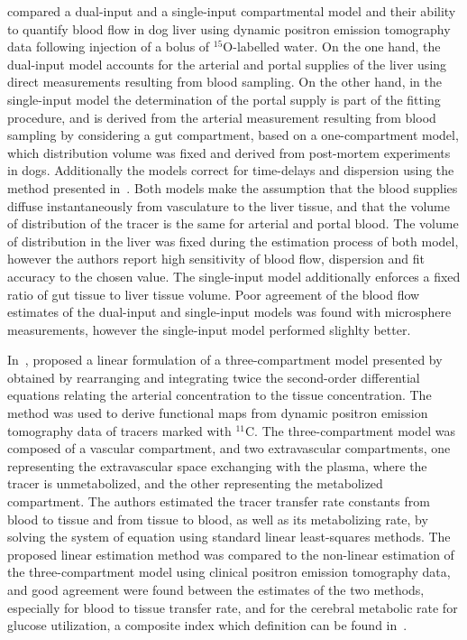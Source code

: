 \citet{Ziegler:1996cs} compared a dual-input and a single-input compartmental model and their ability to quantify blood flow in dog liver using dynamic positron emission tomography data following injection of a bolus of $^{15}$O-labelled water.
On the one hand, the dual-input model accounts for the arterial and portal supplies of the liver using direct measurements resulting from blood sampling.
On the other hand, in the single-input model the determination of the portal supply is part of the fitting procedure, and is derived from the arterial measurement resulting from blood sampling by considering a gut compartment, based on a one-compartment model, which distribution volume was fixed and derived from post-mortem experiments in dogs.
Additionally the models correct for time-delays and dispersion using the method presented in~\cite{Meyer:1989vy}.
Both models make the assumption that the blood supplies diffuse instantaneously from vasculature to the liver tissue, and that the volume of distribution of the tracer is the same for arterial and portal blood.
The volume of distribution in the liver was fixed during the estimation process of both model, however the authors report high sensitivity of blood flow, dispersion and fit accuracy to the chosen value.
The single-input model additionally enforces a fixed ratio of gut tissue to liver tissue volume.
Poor agreement of the blood flow estimates of the dual-input and single-input models was found with microsphere measurements, however the single-input model performed slighlty better.


In~\citeyear{Blomqvist:1984jy}, \citet{Blomqvist:1984jy} proposed a linear formulation of a three-compartment model presented by~\citet{Raichle:1975va} obtained by rearranging and integrating twice the second-order differential equations relating the arterial concentration to the tissue concentration.
The method was used to derive functional maps from dynamic positron emission tomography data of tracers marked with $^{11}$C.
The three-compartment model was composed of a vascular compartment, and two extravascular compartments, one representing the extravascular space exchanging with the plasma, where the tracer is unmetabolized, and the other representing the metabolized compartment.
The authors estimated the tracer transfer rate constants from blood to tissue and from tissue to blood, as well as its metabolizing rate, by solving the system of equation using standard linear least-squares methods.
The proposed linear estimation method was compared to the non-linear estimation of the three-compartment model using clinical positron emission tomography data, and good agreement were found between the estimates of the two methods, especially for blood to tissue transfer rate, and for the cerebral metabolic rate for glucose utilization, a composite index which definition can be found in~\cite{Reivich:1982ir}.

